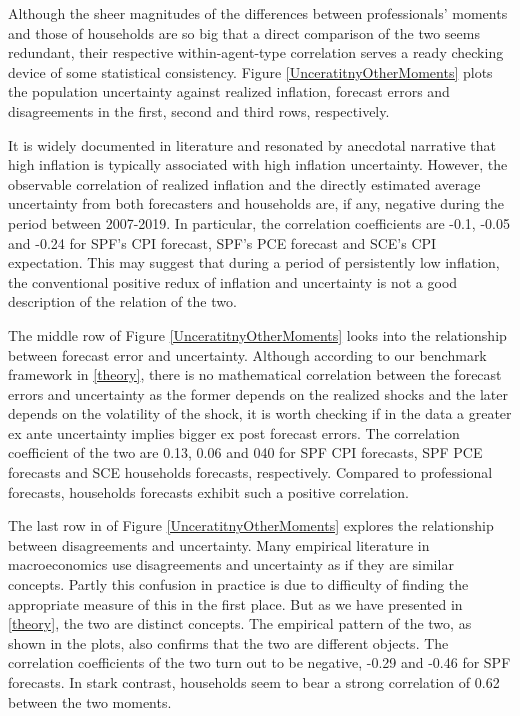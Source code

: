 \documentclass[]{article}
\begin{document}
	
	Although the sheer magnitudes of the differences between professionals' moments and those of households are so big that a direct comparison of the two seems redundant, their respective within-agent-type correlation serves a ready checking device of some statistical consistency. Figure \ref{UnceratitnyOtherMoments} plots the population uncertainty against realized inflation,  forecast errors and disagreements in the first, second and third rows, respectively. 
	
	It is widely documented in literature \cite{xxx, xxx} and resonated by anecdotal narrative that high inflation is typically associated with high inflation uncertainty. However, the observable correlation of realized inflation and the directly estimated average uncertainty from both  forecasters and households are, if any, negative during the period between 2007-2019. In particular, the correlation coefficients are -0.1, -0.05 and -0.24 for SPF's  CPI forecast, SPF's PCE forecast and SCE's CPI expectation. This may suggest that during a period of persistently low inflation, the conventional positive redux of inflation and uncertainty is not a good description of the relation of the two. 
	
	The middle row of Figure \ref{UnceratitnyOtherMoments} looks into the relationship between forecast error and uncertainty. Although according to our benchmark framework in \ref{theory}, there is no mathematical correlation between the forecast errors and uncertainty as the former depends on the realized shocks and the later depends on the volatility of the shock, it is worth checking if in the data a greater ex ante uncertainty implies bigger ex post forecast errors. The correlation coefficient of the two are 0.13, 0.06 and 040 for SPF CPI forecasts, SPF PCE forecasts and SCE households forecasts, respectively. Compared to professional forecasts, households forecasts exhibit such a positive correlation.  
	
	The last row in of Figure \ref{UnceratitnyOtherMoments} explores the relationship between disagreements and uncertainty. Many empirical literature in macroeconomics use disagreements and uncertainty as if they are similar concepts. Partly this confusion in practice is due to difficulty of finding the appropriate measure of this in the first place. But as we have presented in \ref{theory}, the two are distinct concepts. The empirical pattern of the two,  as shown in the plots, also confirms that the two are different objects. The correlation coefficients of the two turn out to be negative, -0.29 and -0.46 for SPF forecasts. In stark contrast, households seem to bear a strong correlation of 0.62 between the two moments.  
	
\end{document}

